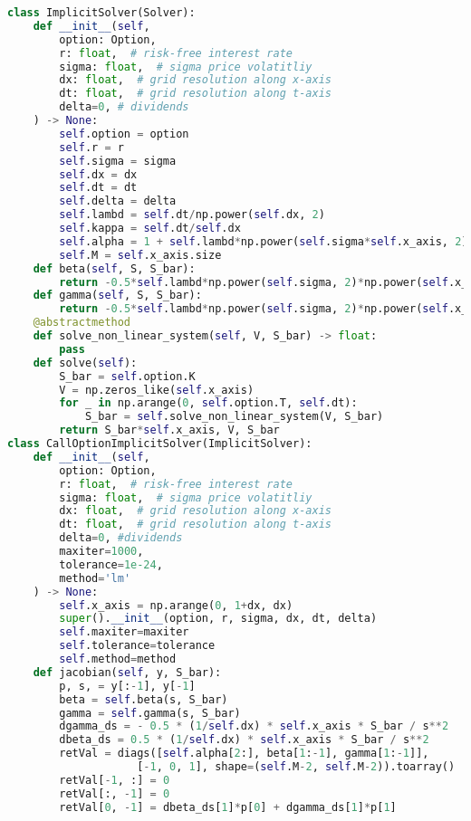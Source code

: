 \begin{lstlisting}[language=Python, caption=Implicit solver for Nielsen transformation]
class ImplicitSolver(Solver):
    def __init__(self, 
        option: Option,
        r: float,  # risk-free interest rate
        sigma: float,  # sigma price volatitliy
        dx: float,  # grid resolution along x-axis
        dt: float,  # grid resolution along t-axis
        delta=0, # dividends
    ) -> None:
        self.option = option
        self.r = r
        self.sigma = sigma
        self.dx = dx
        self.dt = dt
        self.delta = delta
        self.lambd = self.dt/np.power(self.dx, 2)
        self.kappa = self.dt/self.dx
        self.alpha = 1 + self.lambd*np.power(self.sigma*self.x_axis, 2) + self.r*self.dt
        self.M = self.x_axis.size 
    def beta(self, S, S_bar):
        return -0.5*self.lambd*np.power(self.sigma, 2)*np.power(self.x_axis, 2) + 0.5*self.kappa*self.x_axis*((self.r-self.delta) - (S_bar - S)/(self.dt*S))
    def gamma(self, S, S_bar):
        return -0.5*self.lambd*np.power(self.sigma, 2)*np.power(self.x_axis, 2) - 0.5*self.kappa*self.x_axis*((self.r-self.delta) - (S_bar - S)/(self.dt*S))
    @abstractmethod
    def solve_non_linear_system(self, V, S_bar) -> float:
        pass
    def solve(self):
        S_bar = self.option.K
        V = np.zeros_like(self.x_axis)
        for _ in np.arange(0, self.option.T, self.dt):
            S_bar = self.solve_non_linear_system(V, S_bar)
        return S_bar*self.x_axis, V, S_bar
class CallOptionImplicitSolver(ImplicitSolver):
    def __init__(self, 
        option: Option,
        r: float,  # risk-free interest rate
        sigma: float,  # sigma price volatitliy
        dx: float,  # grid resolution along x-axis
        dt: float,  # grid resolution along t-axis
        delta=0, #dividends
        maxiter=1000,
        tolerance=1e-24,
        method='lm'
    ) -> None:
        self.x_axis = np.arange(0, 1+dx, dx)
        super().__init__(option, r, sigma, dx, dt, delta)
        self.maxiter=maxiter
        self.tolerance=tolerance
        self.method=method
    def jacobian(self, y, S_bar):
        p, s, = y[:-1], y[-1]
        beta = self.beta(s, S_bar)
        gamma = self.gamma(s, S_bar)
        dgamma_ds = - 0.5 * (1/self.dx) * self.x_axis * S_bar / s**2
        dbeta_ds = 0.5 * (1/self.dx) * self.x_axis * S_bar / s**2
        retVal = diags([self.alpha[2:], beta[1:-1], gamma[1:-1]],
                    [-1, 0, 1], shape=(self.M-2, self.M-2)).toarray()
        retVal[-1, :] = 0
        retVal[:, -1] = 0
        retVal[0, -1] = dbeta_ds[1]*p[0] + dgamma_ds[1]*p[1]

\end{lstlisting}

